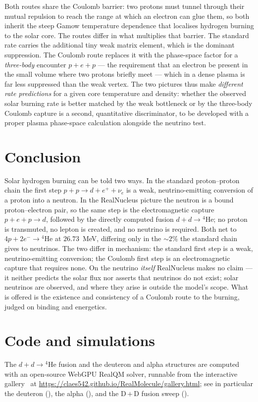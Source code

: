 \documentclass[11pt]{article}
\begin{document}
Both routes share the Coulomb barrier: two protons must tunnel through their mutual repulsion to reach
the range at which an electron can glue them, so both inherit the steep Gamow temperature dependence
that localises hydrogen burning to the solar core. The routes differ in what multiplies that barrier.
The standard rate carries the additional tiny weak matrix element, which is the dominant suppression.
The Coulomb route replaces it with the phase-space factor for a \emph{three-body} encounter
$p+e+p$ --- the requirement that an electron be present in the small volume where two protons briefly
meet --- which in a dense plasma is far less suppressed than the weak vertex. The two pictures thus
make \emph{different rate predictions} for a given core temperature and density: whether the observed
solar burning rate is better matched by the weak bottleneck or by the three-body Coulomb capture is a
second, quantitative discriminator, to be developed with a proper plasma phase-space calculation
alongside the neutrino test.

\section{Conclusion}

Solar hydrogen burning can be told two ways. In the standard proton--proton chain the first step
$p+p\to d+e^{+}+\nu_e$ is a weak, neutrino-emitting conversion of a proton into a neutron. In the
RealNucleus picture the neutron is a bound proton--electron pair, so the same step is the
electromagnetic capture $p+e+p\to d$, followed by the directly computed fusion $d+d\to{}^4\mathrm{He}$;
no proton is transmuted, no lepton is created, and no neutrino is required. Both net to
$4p+2e^-\to{}^4\mathrm{He}$ at $26.73$~MeV, differing only in the ${\sim}2\%$ the standard chain gives
to neutrinos. The two differ in mechanism: the standard first step is a weak, neutrino-emitting
conversion; the Coulomb first step is an electromagnetic capture that requires none. On the neutrino
\emph{itself} RealNucleus makes no claim --- it neither predicts the solar flux nor asserts that
neutrinos do not exist; solar neutrinos are observed, and where they arise is outside the model's scope.
What is offered is the existence and consistency of a Coulomb route to the burning, judged on binding
and energetics.

\section*{Code and simulations}
\sloppy
The $d+d\to{}^4\mathrm{He}$ fusion and the deuteron and alpha structures are computed with an
open-source WebGPU RealQM solver, runnable from the interactive gallery~\cite{Gallery} at
\url{https://claes542.github.io/RealMolecule/gallery.html}; see in particular the deuteron
(), the alpha (), and the D\,$+$\,D fusion sweep
().
\fussy
\end{document}
